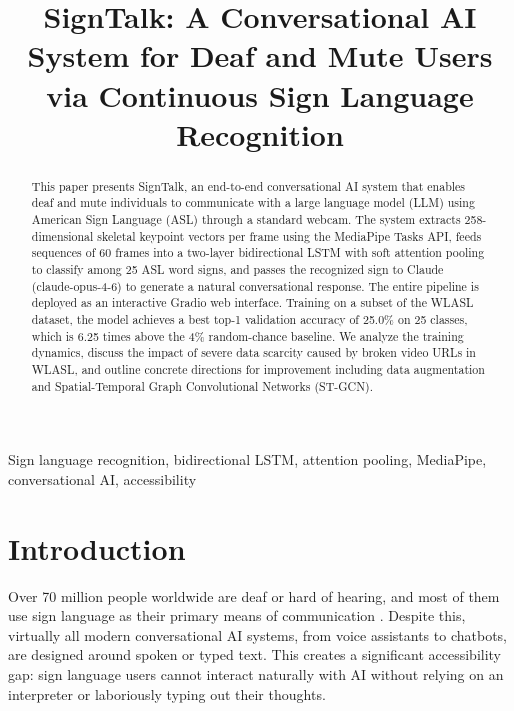 \documentclass[conference]{IEEEtran}
\begin{document}
\title{SignTalk: A Conversational AI System for Deaf and Mute Users via Continuous Sign Language Recognition}

\author{
}

\maketitle

\begin{abstract}
This paper presents SignTalk, an end-to-end conversational AI system that enables deaf and mute individuals to communicate with a large language model (LLM) using American Sign Language (ASL) through a standard webcam. The system extracts 258-dimensional skeletal keypoint vectors per frame using the MediaPipe Tasks API, feeds sequences of 60 frames into a two-layer bidirectional LSTM with soft attention pooling to classify among 25 ASL word signs, and passes the recognized sign to Claude (claude-opus-4-6) to generate a natural conversational response. The entire pipeline is deployed as an interactive Gradio web interface. Training on a subset of the WLASL dataset, the model achieves a best top-1 validation accuracy of 25.0\% on 25 classes, which is 6.25 times above the 4\% random-chance baseline. We analyze the training dynamics, discuss the impact of severe data scarcity caused by broken video URLs in WLASL, and outline concrete directions for improvement including data augmentation and Spatial-Temporal Graph Convolutional Networks (ST-GCN).
\end{abstract}

\begin{IEEEkeywords}
Sign language recognition, bidirectional LSTM, attention pooling, MediaPipe, conversational AI, accessibility
\end{IEEEkeywords}

\section{Introduction}

Over 70 million people worldwide are deaf or hard of hearing, and most of them use sign language as their primary means of communication \cite{who2023}. Despite this, virtually all modern conversational AI systems, from voice assistants to chatbots, are designed around spoken or typed text. This creates a significant accessibility gap: sign language users cannot interact naturally with AI without relying on an interpreter or laboriously typing out their thoughts.
\end{document}
